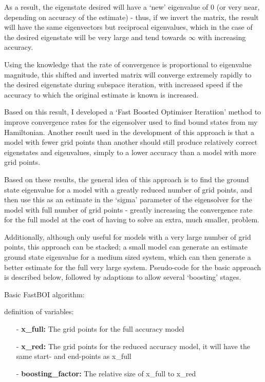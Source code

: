 As a result, the eigenstate desired will have a `new' eigenvalue of $0$ (or very near, depending on accuracy of the estimate) - thus, if we invert the matrix, the result will have the same eigenvectors but reciprocal eigenvalues, which in the case of the desired eigenstate will be very large and tend towards $\infty$ with increasing accuracy. 

Using the knowledge that the rate of convergence is proportional to eigenvalue magnitude, this shifted and inverted matrix will converge extremely rapidly to the desired eigenstate during subspace iteration, with increased speed if the accuracy to which the original estimate is known is increased.

Based on this result, I developed a `Fast Boosted Optimiser Iteratiion' method to improve convergence rates for the eigensolver used to find bound states from my Hamiltonian. Another result used in the development of this approach is that a model with fewer grid points than another should still produce relatively correct eigenstates and eigenvalues, simply to a lower accuracy than a model with more grid points. 

Based on these results, the general idea of this approach is to find the ground state eigenvalue for a model with a greatly reduced number of grid points, and then use this as an estimate in the `sigma' parameter of the eigensolver for the model with full number of grid points - greatly increasing the convergence rate for the full model at the cost of having to solve an extra, much smaller, problem. 

Additionally, although only useful for models with a very large number of grid points, this approach can be stacked; a small model can generate an estimate ground state eigenvalue for a medium sized system, which can then generate a better estimate for the full very large system. Pseudo-code for the basic approach is described below, followed by  adaptions to allow several `boosting' stages.

Basic FastBOI algorithm:

definition of variables:
\begin{itemize}

	\item[-]{\textbf{x_full:} The grid points for the full accuracy model}
	\item[-]{\textbf{x_red:} The grid points for the reduced accuracy model, it will have the same start- and end-points as x_full}
	\item[-]{\textbf{boosting_factor:} The relative size of x_full to x_red}

\end{itemize}


